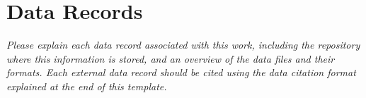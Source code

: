 \section{Data Records}

\textit{Please explain each data record associated with this work, including the repository where this information is stored, and an overview of the data files and their formats. Each external data record should be cited using the data citation format explained at the end of this template. }